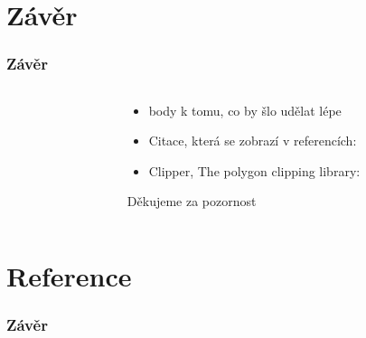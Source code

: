 \documentclass[notes=false,pdftex]{beamer}
\begin{document}
\section{Závěr}
\begin{frame}
	\frametitle{Závěr}

	\begin{columns}[T]
		\begin{column}{0.5\textwidth}
		\end{column}
		\begin{column}{0.5\textwidth}
			\begin{itemize}
				\item body k tomu, co by šlo udělat lépe\pause
				\item Citace, která se zobrazí v referencích: \cite{Wurm2008Coordinated}
				\item Clipper, The polygon clipping library: \cite{ClipperLib}
			\end{itemize}
			\pause
			\vspace{13ex}\hspace*{\fill}Děkujeme za pozornost
		\end{column}
	\end{columns}

\end{frame}

\section{Reference}
\begin{frame}
	\frametitle{Závěr}

	
	
	
\end{frame}
\end{document}
